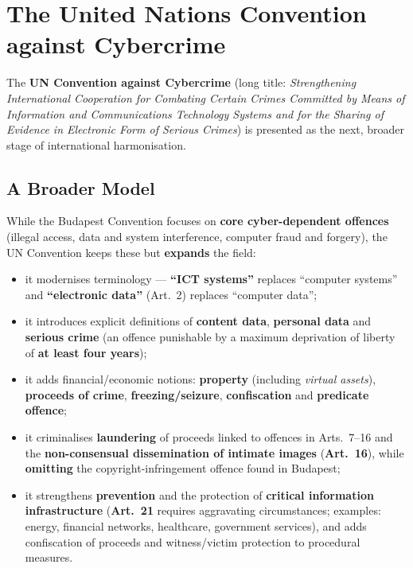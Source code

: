 \documentclass[11pt,a4paper,openany]{report}
\theoremstyle{definition}
\theoremstyle{plain}
\theoremstyle{remark}
\begin{document}
\section{The United Nations Convention against Cybercrime}

The \textbf{UN Convention against Cybercrime} (long title: \textit{Strengthening International Cooperation for Combating Certain Crimes Committed by Means of Information and Communications Technology Systems and for the Sharing of Evidence in Electronic Form of Serious Crimes}) is presented as the next, broader stage of international harmonisation.

\subsection{A Broader Model}

While the Budapest Convention focuses on \textbf{core cyber-dependent offences} (illegal access, data and system interference, computer fraud and forgery), the UN Convention keeps these but \textbf{expands} the field:
\begin{itemize}
    \item it modernises terminology --- \textbf{``ICT systems''} replaces ``computer systems'' and \textbf{``electronic data''} (Art.\ 2) replaces ``computer data'';
    \item it introduces explicit definitions of \textbf{content data}, \textbf{personal data} and \textbf{serious crime} (an offence punishable by a maximum deprivation of liberty of \textbf{at least four years});
    \item it adds financial/economic notions: \textbf{property} (including \emph{virtual assets}), \textbf{proceeds of crime}, \textbf{freezing/seizure}, \textbf{confiscation} and \textbf{predicate offence};
    \item it criminalises \textbf{laundering} of proceeds linked to offences in Arts.\ 7--16 and the \textbf{non-consensual dissemination of intimate images} (\textbf{Art.\ 16}), while \textbf{omitting} the copyright-infringement offence found in Budapest;
    \item it strengthens \textbf{prevention} and the protection of \textbf{critical information infrastructure} (\textbf{Art.\ 21} requires aggravating circumstances; examples: energy, financial networks, healthcare, government services), and adds confiscation of proceeds and witness/victim protection to procedural measures.
\end{itemize}
\end{document}
